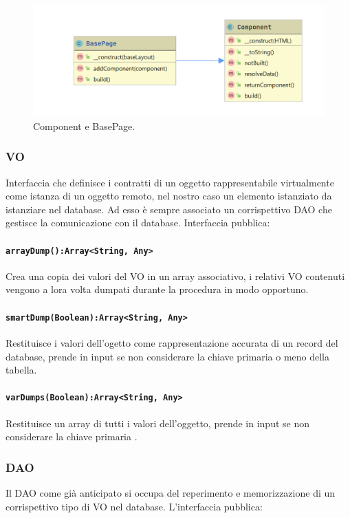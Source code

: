 \documentclass[12pt, a4paper]{article}
\begin{document}
    \begin{figure}[htbp]
        \label{fig:fs}
        \hspace*{-2cm}
        \includegraphics[scale=0.6]{Component.png}

        \caption{Component e BasePage.}
    \end{figure}

    \subsubsection{VO}
    Interfaccia che definisce i contratti di un oggetto rappresentabile virtualmente come istanza di un oggetto remoto, nel nostro caso un elemento istanziato da istanziare nel database.
    Ad esso è sempre associato un corrispettivo DAO che gestisce la comunicazione con il database. Interfaccia pubblica:
    \paragraph{\texttt{arrayDump():Array<String, Any>}} Crea una copia dei valori del VO in un array associativo, i relativi VO contenuti vengono a lora volta dumpati durante la procedura in modo opportuno.
    \paragraph{\texttt{smartDump(Boolean):Array<String, Any>}} Restituisce i valori dell'ogetto come rappresentazione accurata di un record del database, prende in input se non considerare la chiave primaria o meno della tabella.
    \paragraph{\texttt{varDumps(Boolean):Array<String, Any>}} Restituisce un array di tutti i valori dell'oggetto, prende in input se non considerare la chiave primaria .


    \subsubsection{DAO}
    Il DAO come già anticipato si occupa del reperimento e memorizzazione di un corrispettivo tipo di VO nel database. L'interfaccia pubblica:
\end{document}

